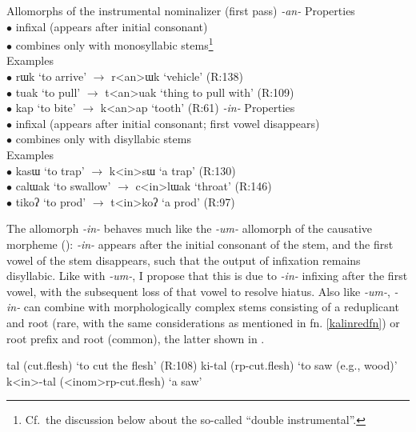 \documentclass[output=paper]{langscibook}
\begin{document}
\ea Allomorphs of the instrumental nominalizer (first pass) \label{kalininstallos}
\ea \textit{-an-} \label{kalininstallosb}
\ea Properties\\
$\bullet$ infixal (appears after initial consonant)\\
$\bullet$ combines only with monosyllabic stems\footnote{Cf.\ the discussion below about the so-called ``double instrumental''.}\\
\ex Examples\\
$\bullet$ rɯk `to arrive' $\rightarrow$ r<an>ɯk `vehicle' \hfill (R:138)\\
$\bullet$ tuak `to pull' $\rightarrow$ t<an>uak `thing to pull with' \hfill (R:109)\\
$\bullet$ kap `to bite' $\rightarrow$ k<an>ap `tooth' \hfill (R:61)
\z
\ex \textit{-in-} \label{kalininstallosa}
\ea  Properties\\
$\bullet$ infixal (appears after initial consonant; first vowel disappears)\\
$\bullet$ combines only with disyllabic stems\\
\ex Examples\\
$\bullet$ kasɯ `to trap' $\rightarrow$ k<in>sɯ `a trap' \hfill (R:130)\\
$\bullet$ calɯak `to swallow' $\rightarrow$ c<in>lɯak `throat' \hfill (R:146)\\
$\bullet$ tikoʔ `to prod' $\rightarrow$ t<in>koʔ `a prod' \hfill (R:97)
\z
\z
\z

The allomorph \textit{-in-} behaves much like the \textit{-um-} allomorph of the causative morpheme (): \textit{-in-} appears after the initial consonant of the stem, and the first vowel of the stem disappears, such that the output of infixation remains disyllabic. Like with \textit{-um-}, I propose that this is due to \textit{-in-} infixing after the first vowel, with the subsequent loss of that vowel to resolve hiatus. Also like  \textit{-um-},  \textit{-in-} can combine with morphologically complex stems consisting of a reduplicant and root (rare, with the same considerations as mentioned in fn. \ref{kalinredfn}) or root prefix and root (common), the latter shown in \Next.

\ea
\ea tal (cut.flesh) \hfill `to cut the flesh' (R:108)
\ex ki-tal ({\sc rp-}cut.flesh) \hfill `to saw (e.g., wood)' 
\ex k<in>-tal ({\sc <inom>rp-}cut.flesh) \hfill `a saw' \label{kalinrpinstc}
\z
\z
\end{document}
